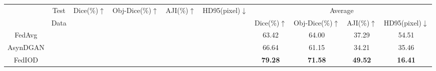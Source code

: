 \documentclass[letterpaper]{article} %
\newcommand{\cmark}{\ding{51}}%
\newcommand{\xmark}{\ding{55}}%
\begin{document}
\begin{table}
\centering
\resizebox{\textwidth}{!}
{
\begin{tabular}{c|ccccc|cccc}
\toprule
&Test   &\multirow{2}{*}{Dice(\%)$\uparrow$} &\multirow{2}{*}{Obj-Dice(\%)$\uparrow$} &\multirow{2}{*}{{AJI(\%)$\uparrow$}} &\multirow{2}{*}{HD95(pixel)$\downarrow$} &\multicolumn{4}{c}{Average}\\
&Data & & & &  &Dice(\%)$\uparrow$ &{Obj-Dice(\%)$\uparrow$} &{AJI(\%)$\uparrow$} &HD95(pixel)$\downarrow$\\
\midrule
\multirow{3}{*}{FedAvg}  
&\cellcolor{gray0}{Cell17}  &\cellcolor{gray0}{68.74} &\cellcolor{gray0}{65.82} &\cellcolor{gray0}{39.37}  &\cellcolor{gray0}{24.15} &\multirow{3}{*}{63.42} &\multirow{3}{*}{64.00} &\multirow{3}{*}{37.29}  &\multirow{3}{*}{54.51} \\
&\cellcolor{gray1}{TCGA}  &\cellcolor{gray1}{77.57} &\cellcolor{gray1}{72.94} &\cellcolor{gray1}{50.03} &\cellcolor{gray1}{15.87} & & &  \\
&\cellcolor{gray2}{TNBC}  &\cellcolor{gray2}{43.95} &\cellcolor{gray2}{53.23} &\cellcolor{gray2}{22.48} &\cellcolor{gray2}{123.51} & & &  \\ \midrule
\multirow{3}{*}{AsynDGAN} 
&\cellcolor{gray0}{Cell17}  &\cellcolor{gray0}{79.82} &\cellcolor{gray0}{59.03} &\cellcolor{gray0}{34.64} &\cellcolor{gray0}{19.27} &\multirow{3}{*}{66.64}   &\multirow{3}{*}{61.15} &\multirow{3}{*}{34.21}  &\multirow{3}{*}{35.46} \\
&\cellcolor{gray1}{TCGA}  &\cellcolor{gray1}{52.29} &\cellcolor{gray1}{57.12} &\cellcolor{gray1}{26.03} &\cellcolor{gray1}{47.47} & & &  \\
&\cellcolor{gray2}{TNBC}  &\cellcolor{gray2}{67.80} &\cellcolor{gray2}{67.31} &\cellcolor{gray2}{41.96} &\cellcolor{gray2}{39.63} & & &  \\ \midrule
\multirow{3}{*}{FedIOD}  
&\cellcolor{gray0}{Cell17} &\cellcolor{gray0}{86.23} &\cellcolor{gray0}{68.03} &\cellcolor{gray0}{44.75} &\cellcolor{gray0}{7.01}  &\multirow{3}{*}{\bf{79.28}}  &\multirow{3}{*}{\bf{71.58}} &\multirow{3}{*}{\bf{49.52}} &\multirow{3}{*}{\bf{16.41}}  \\

\end{tabular}}
\end{table}
\end{document}
